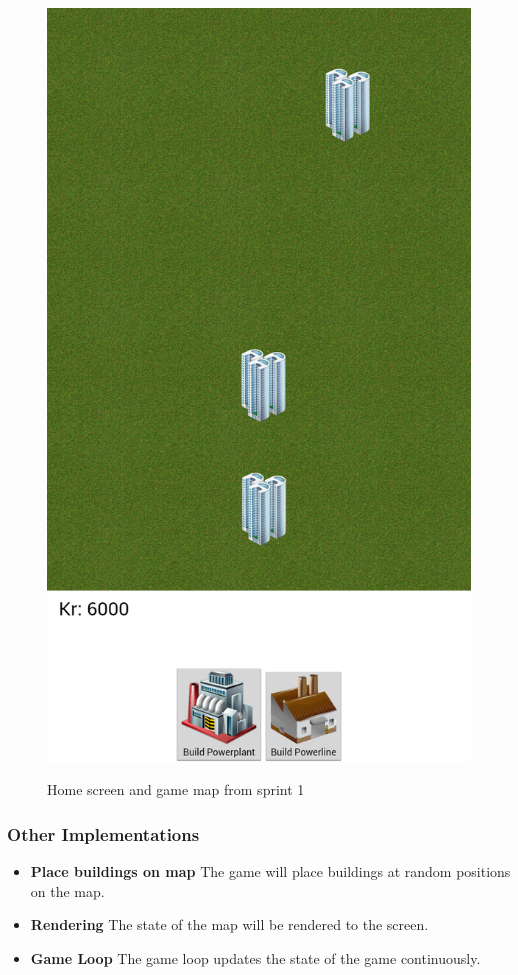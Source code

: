 \begin{figure}[H]
{		\includegraphics[scale=0.2]{pictures/game_screenshot_1}
	}
	\caption{Home screen and game map from sprint 1}
	\end{figure}

	\subsubsection*{Other Implementations}
		\begin{itemize}
			\item {\bf Place buildings on map} The game will place buildings at random positions on the map.
			\item {\bf Rendering} The state of the map will be rendered to the screen.
			\item {\bf Game Loop} The game loop updates the state of the game continuously.
		\end{itemize}


